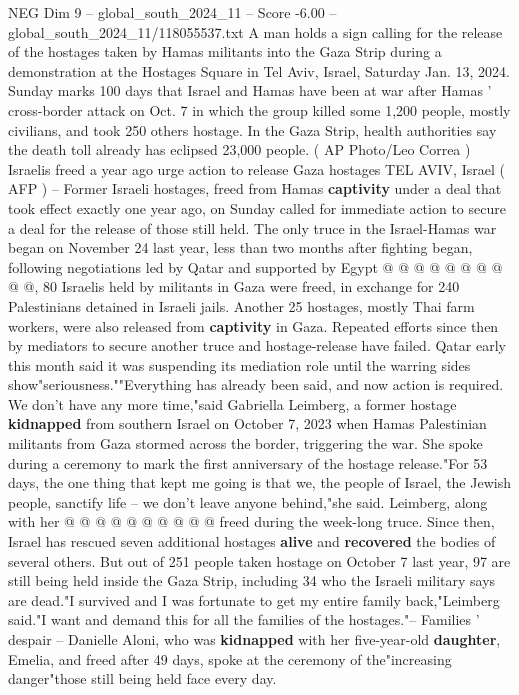 \begin{textsample}{NEG Dim 9 – global\_south\_2024\_11 – Score -6.00 – global\_south\_2024\_11/118055537.txt}  \label{ex:f9_neg_411}
A man holds a sign calling for the release of the hostages taken by Hamas militants into the Gaza Strip during a demonstration at the Hostages Square in Tel Aviv, Israel, Saturday Jan. 13, 2024.
Sunday marks 100 days that Israel and Hamas have been at war after Hamas ' cross-border attack on Oct. 7 in which the group killed some 1,200 people, mostly civilians, and took 250 others hostage.
In the Gaza Strip, health authorities say the death toll already has eclipsed 23,000 people. ( AP Photo/Leo Correa ) Israelis freed a year ago urge action to release Gaza hostages TEL AVIV, Israel ( AFP ) -- Former Israeli hostages, freed from Hamas \textbf{captivity} under a deal that took effect exactly one year ago, on Sunday called for immediate action to secure a deal for the release of those still held.
The only truce in the Israel-Hamas war began on November 24 last year, less than two months after fighting began, following negotiations led by Qatar and supported by Egypt @ @ @ @ @ @ @ @ @ @, 80 Israelis held by militants in Gaza were freed, in exchange for 240 Palestinians detained in Israeli jails.
Another 25 hostages, mostly Thai farm workers, were also released from \textbf{captivity} in Gaza.
Repeated efforts since then by mediators to secure another truce and hostage-release have failed.
Qatar early this month said it was suspending its mediation role until the warring sides show"seriousness.""Everything has already been said, and now action is required.
We don't have any more time,"said Gabriella Leimberg, a former hostage \textbf{kidnapped} from southern Israel on October 7, 2023 when Hamas Palestinian militants from Gaza stormed across the border, triggering the war.
She spoke during a ceremony to mark the first anniversary of the hostage release."For 53 days, the one thing that kept me going is that we, the people of Israel, the Jewish people, sanctify life -- we don't leave anyone behind,"she said.
Leimberg, along with her @ @ @ @ @ @ @ @ @ @ freed during the week-long truce.
Since then, Israel has rescued seven additional hostages \textbf{alive} and \textbf{recovered} the bodies of several others.
But out of 251 people taken hostage on October 7 last year, 97 are still being held inside the Gaza Strip, including 34 who the Israeli military says are dead."I survived and I was fortunate to get my entire family back,"Leimberg said."I want and demand this for all the families of the hostages."-- Families ' despair -- Danielle Aloni, who was \textbf{kidnapped} with her five-year-old \textbf{daughter}, Emelia, and freed after 49 days, spoke at the ceremony of the"increasing danger"those still being held face every day.

\end{textsample}
